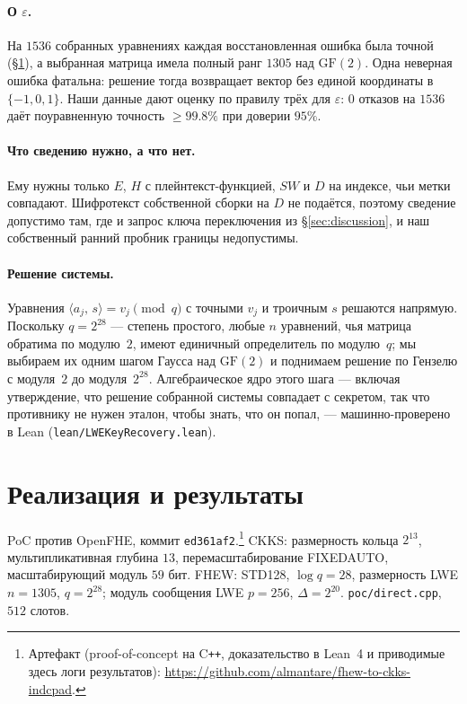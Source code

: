 \documentclass[11pt]{article}
\newcommand{\inner}[2]{\langle #1,\, #2\rangle}
\newcommand{\code}[1]{\texttt{#1}}
\newcommand{\artifacturl}{https://github.com/almantare/fhew-to-ckks-indcpad}
\begin{document}
\paragraph{О $\varepsilon$.}
На $1536$ собранных уравнениях каждая восстановленная
ошибка была точной (\S\ref{sec:results}), а выбранная матрица имела полный ранг $1305$ над
$\mathrm{GF}(2)$. Одна неверная ошибка фатальна: решение тогда возвращает вектор
без единой координаты в $\{-1,0,1\}$. Наши данные дают
оценку по правилу трёх для $\varepsilon$: $0$ отказов на $1536$ даёт поуравненную
точность $\geq 99{.}8\%$ при доверии $95\%$.

\paragraph{Что сведению нужно, а что нет.}
Ему нужны только $E$, $H$ с плейнтекст-функцией, $\mathit{SW}$ и $D$ на индексе, чьи метки совпадают.
Шифротекст собственной сборки на $D$ не подаётся, поэтому сведение допустимо там, где и запрос
ключа переключения из \S\ref{sec:discussion}, и наш собственный ранний пробник
границы недопустимы.

\paragraph{Решение системы.}
Уравнения $\inner{a_j}{s} = v_j \pmod q$ с точными $v_j$ и троичным $s$ решаются напрямую. Поскольку
$q = 2^{28}$ --- степень простого, любые $n$ уравнений, чья матрица обратима по модулю~$2$, имеют
единичный определитель по модулю~$q$; мы выбираем их одним шагом Гаусса над $\mathrm{GF}(2)$ и
поднимаем решение по Гензелю с модуля~$2$ до модуля~$2^{28}$. Алгебраическое ядро этого шага ---
включая утверждение, что решение собранной системы совпадает с секретом, так что противнику не нужен
эталон, чтобы знать, что он попал, --- машинно-проверено в Lean (\code{lean/LWEKeyRecovery.lean}).

\section{Реализация и результаты}
\label{sec:results}

PoC против OpenFHE, коммит \code{ed361af2}.\footnote{Артефакт (proof-of-concept на C\texttt{++},
доказательство в Lean~4 и приводимые здесь логи результатов): \url{\artifacturl}.} CKKS: размерность
кольца $2^{13}$, мультипликативная глубина $13$, перемасштабирование FIXEDAUTO, масштабирующий модуль
$59$ бит. FHEW: STD128, $\log q = 28$, размерность LWE $n = 1305$, $q = 2^{28}$; модуль сообщения LWE
$p = 256$, $\Delta = 2^{20}$. \code{poc/direct.cpp}, $512$ слотов.
\end{document}
